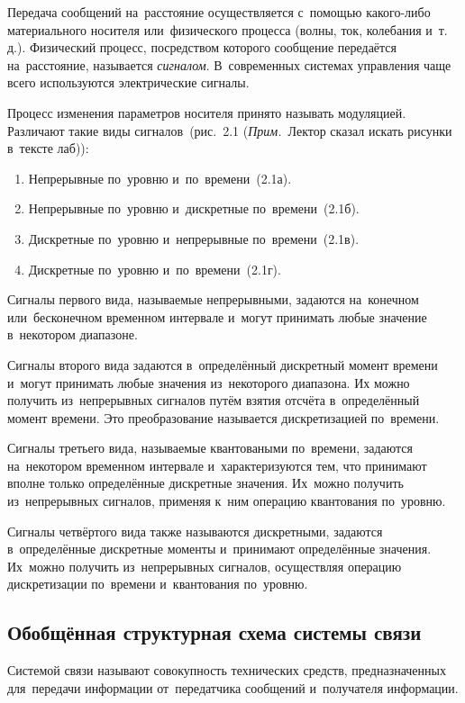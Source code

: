 \documentclass[
	a4paper,
	oneside,
	BCOR = 10mm,
	DIV = 12,
	12pt,
	headings = normal,
]{scrartcl}
\newcommand{\mynote}[1]{(\textit{Прим.}~#1)}
\begin{document}
			Передача сообщений на~расстояние осуществляется с~помощью какого-либо материального носителя или~физического процесса (волны, ток, колебания и~т.\,д.). Физический процесс, посредством которого сообщение передаётся на~расстояние, называется \emph{сигналом}. В~современных системах управления чаще всего используются электрические сигналы.

			Процесс изменения параметров носителя принято называть модуляцией. Различают такие виды сигналов~(рис.~2.1 \mynote{Лектор сказал искать рисунки в~тексте лаб}):
			\begin{enumerate}[noitemsep]
				\item Непрерывные по~уровню и~по~времени~(2.1а).
				\item Непрерывные по~уровню и~дискретные по~времени~(2.1б).
				\item Дискретные по~уровню и~непрерывные по~времени~(2.1в).
				\item Дискретные по~уровню и~по~времени~(2.1г).
			\end{enumerate}

			Сигналы первого вида, называемые непрерывными, задаются на~конечном или~бесконечном временном интервале и~могут принимать любые значение в~некотором диапазоне. 

			Сигналы второго вида задаются в~определённый дискретный момент времени и~могут принимать любые значения из~некоторого диапазона. Их можно получить из~непрерывных сигналов путём взятия отсчёта в~определённый момент времени. Это преобразование называется дискретизацией по~времени.

			Сигналы третьего вида, называемые квантоваными по~времени, задаются на~некотором временном интервале и~характеризуются тем, что принимают вполне только определённые дискретные значения. Их~можно получить из~непрерывных сигналов, применяя к~ним операцию квантования по~уровню.

			Сигналы четвёртого вида также называются дискретными, задаются в~определённые дискретные моменты и~принимают определённые значения. Их~можно получить из~непрерывных сигналов, осуществляя операцию дискретизации по~времени и~квантования по~уровню.

			\subsection{Обобщённая структурная схема системы связи}
				Системой связи называют совокупность технических средств, предназначенных для~передачи информации от~передатчика сообщений и~получателя информации.
\end{document}
